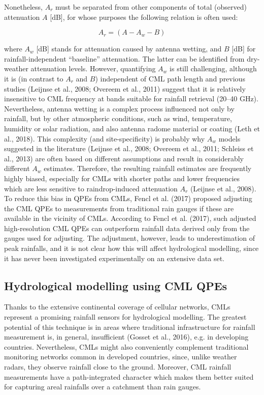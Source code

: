 \documentclass{ctuthesis}\usepackage[]{graphicx}\usepackage[]{color}
\begin{document}
Nonetheless, $A_r$ must be separated from other components of total (observed) attenuation $A$ [dB], for whose purposes the following relation is often used: 

\begin{equation} \label{2eq2}
A_r = (A - A_w - B)
\end{equation}

where $A_w$ [dB] stands for attenuation caused by antenna wetting, and $B$ [dB] for rainfall-independent \enquote{baseline} attenuation. The latter can be identified from dry-weather attenuation levels. However, quantifying $A_w$ is still challenging, although it is (in contrast to $A_r$ and $B$) independent of CML path length and previous studies (Leijnse et al., 2008; Overeem et al., 2011) suggest that it is relatively insensitive to CML frequency at bands suitable for rainfall retrieval (20--40 GHz). Nevertheless, antenna wetting is a complex process influenced not only by rainfall, but by other atmospheric conditions, such as wind, temperature, humidity or solar radiation, and also antenna radome material or coating (Leth et al., 2018). This complexity (and site-specificity) is probably why $A_w$ models suggested in the literature (Leijnse et al., 2008; Overeem et al., 2011; Schleiss et al., 2013) are often based on different assumptions and result in considerably different $A_w$ estimates. Therefore, the resulting rainfall estimates are frequently highly biased, especially for CMLs with shorter paths and lower frequencies which are less sensitive to raindrop-induced attenuation $A_r$ (Leijnse et al., 2008). To reduce this bias in QPEs from CMLs, Fencl et al. (2017) proposed adjusting the CML QPEs to measurements from traditional rain gauges if these are available in the vicinity of CMLs. According to Fencl et al. (2017), such adjusted high-resolution CML QPEs can outperform rainfall data derived only from the gauges used for adjusting. The adjustment, however, leads to underestimation of peak rainfalls, and it is not clear how this will affect hydrological modelling, since it has never been investigated experimentally on an extensive data set.


\subsection{Hydrological modelling using CML QPEs}

Thanks to the extensive continental coverage of cellular networks, CMLs represent a promising rainfall sensors for hydrological modelling. The greatest potential of this technique is in areas where traditional infrastructure for rainfall measurement is, in general, insufficient (Gosset et al., 2016), e.g. in developing countries. Nevertheless, CMLs might also conveniently complement traditional monitoring networks common in developed countries, since, unlike weather radars, they observe rainfall close to the ground. Moreover, CML rainfall measurements have a path-integrated character which makes them better suited for capturing areal rainfalls over a catchment than rain gauges. 
\end{document}
